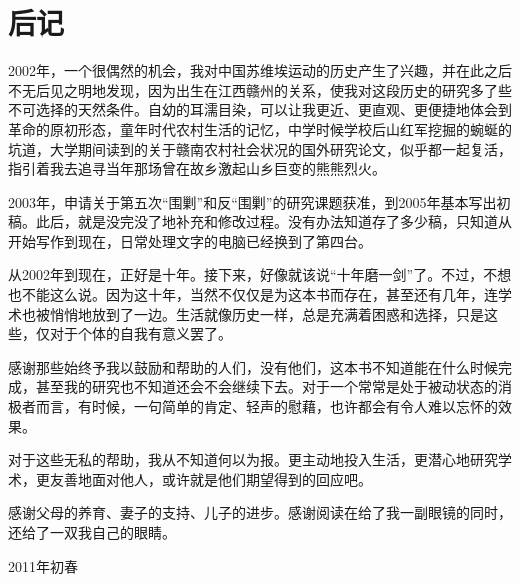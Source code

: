 \chapter*{后记}

2002年，一个很偶然的机会，我对中国苏维埃运动的历史产生了兴趣，并在此之后不无后见之明地发现，因为出生在江西赣州的关系，使我对这段历史的研究多了些不可选择的天然条件。自幼的耳濡目染，可以让我更近、更直观、更便捷地体会到革命的原初形态，童年时代农村生活的记忆，中学时候学校后山红军挖掘的蜿蜒的坑道，大学期间读到的关于赣南农村社会状况的国外研究论文，似乎都一起复活，指引着我去追寻当年那场曾在故乡激起山乡巨变的熊熊烈火。


2003年，申请关于第五次“围剿”和反“围剿”的研究课题获准，到2005年基本写出初稿。此后，就是没完没了地补充和修改过程。没有办法知道存了多少稿，只知道从开始写作到现在，日常处理文字的电脑已经换到了第四台。


从2002年到现在，正好是十年。接下来，好像就该说“十年磨一剑”了。不过，不想也不能这么说。因为这十年，当然不仅仅是为这本书而存在，甚至还有几年，连学术也被悄悄地放到了一边。生活就像历史一样，总是充满着困惑和选择，只是这些，仅对于个体的自我有意义罢了。


感谢那些始终予我以鼓励和帮助的人们，没有他们，这本书不知道能在什么时候完成，甚至我的研究也不知道还会不会继续下去。对于一个常常是处于被动状态的消极者而言，有时候，一句简单的肯定、轻声的慰藉，也许都会有令人难以忘怀的效果。


对于这些无私的帮助，我从不知道何以为报。更主动地投入生活，更潜心地研究学术，更友善地面对他人，或许就是他们期望得到的回应吧。


感谢父母的养育、妻子的支持、儿子的进步。感谢阅读在给了我一副眼镜的同时，还给了一双我自己的眼睛。

\begin{flushright}
2011年初春
\end{flushright}